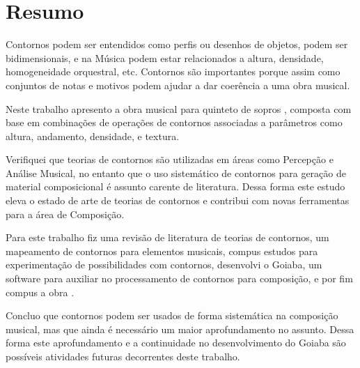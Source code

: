 \chapter*{Resumo}
\label{cha:resumo}

Contornos podem ser entendidos como perfis ou desenhos de objetos,
podem ser bidimensionais, e na Música podem estar relacionados a
altura, densidade, homogeneidade orquestral, etc. Contornos são
importantes porque assim como conjuntos de notas e motivos podem
ajudar a dar coerência a uma obra musical.

Neste trabalho apresento a obra musical para quinteto de sopros
\obra{}, composta com base em combinações de operações de contornos
associadas a parâmetros como altura, andamento, densidade, e textura.

Verifiquei que teorias de contornos são utilizadas em áreas como
Percepção e Análise Musical, no entanto que o uso sistemático de
contornos para geração de material composicional é assunto carente de
literatura. Dessa forma este estudo eleva o estado de arte de teorias
de contornos e contribui com novas ferramentas para a área de
Composição.

Para este trabalho fiz uma revisão de literatura de teorias de
contornos, um mapeamento de contornos para elementos musicais, compus
estudos para experimentação de possibilidades com contornos,
desenvolvi o Goiaba, um software para auxiliar no processamento de
contornos para composição, e por fim compus a obra \obra{}.

Concluo que contornos podem ser usados de forma sistemática na
composição musical, mas que ainda é necessário um maior aprofundamento
no assunto. Dessa forma este aprofundamento e a continuidade no
desenvolvimento do Goiaba são possíveis atividades futuras decorrentes
deste trabalho.
